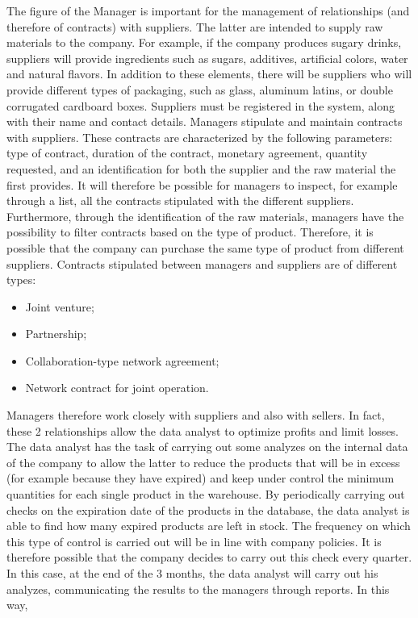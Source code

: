 The figure of the Manager is important for the management of relationships (and therefore of contracts) with suppliers.
The latter are intended to supply raw materials to the company. For example, if the company produces sugary drinks, suppliers
will provide ingredients such as sugars, additives, artificial colors, water and natural flavors. In addition to these elements, there
will be suppliers who will provide different types of packaging, such as glass, aluminum latins, or double corrugated cardboard boxes.
Suppliers must be registered in the system, along with their name and contact details. Managers stipulate and maintain contracts with suppliers.
These contracts are characterized by the following parameters: type of contract, duration of the contract, monetary agreement, quantity requested,
and an identification for both the supplier and the raw material the first provides. It will therefore be possible for managers to inspect, for example
through a list, all the contracts stipulated with the different suppliers. Furthermore, through the identification of the raw materials, managers have
 the possibility to filter contracts based on the type of product. Therefore, it is possible that the company can purchase the same type of product
 from different suppliers. Contracts stipulated between managers and suppliers are of different types:
\begin{itemize}
    \item Joint venture;
    \item Partnership;
    \item Collaboration-type network agreement;
    \item Network contract for joint operation.
\end{itemize}
Managers therefore work closely with suppliers and also with sellers. In fact, these 2 relationships allow the data analyst to optimize profits and limit losses.
The data analyst has the task of carrying out some analyzes on the internal data of the company to allow the latter to reduce the products that will be in excess
(for example because they have expired) and keep under control the minimum quantities for each single product in the warehouse. By periodically carrying out checks
on the expiration date of the products in the database, the data analyst is able to find how many expired products are left in stock. The frequency on which this
type of control is carried out will be in line with company policies. It is therefore possible that the company decides to carry out this check every quarter.
In this case, at the end of the 3 months, the data analyst will carry out his analyzes, communicating the results to the managers through reports. In this way,
